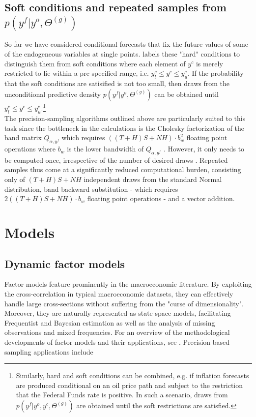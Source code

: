 \documentclass[notitlepage,a4paper,12pt]{article}
\begin{document}
\subsection{Soft conditions and repeated samples from $p(y^f|y^o, \Theta^{(g)})$}

So far we have considered conditional forecasts that fix the future values of some of the endogeneous variables at single points. \citet{waggonerzha1999_res} labels these "hard" conditions to distinguish them from soft conditions where each element of $y^c$ is merely restricted to lie within a pre-specified range, i.e. $y^c_l \leq y^c \leq y^c_u$. If the probability that the soft conditions are satisified is not too small, then draws from the unconditional predictive density $p(y^f|y^o, \Theta^{(g)})$ can be obtained until $y^c_l \leq y^c \leq y^c_u$.\footnote{Similarly, hard and soft conditions can be combined, e.g. if inflation forecasts are produced conditional on an oil price path and subject to the restriction that the Federal Funds rate is positive. In such a scenario, draws from $p(y^f|y^o, y^c, \Theta^{(g)})$ are obtained until the soft restrictions are satisfied.}\\

The precision-sampling algorithms outlined above are particularly suited to this task since the bottleneck in the calculations is the Cholesky factorization of the band matrix $Q_{\alpha, y^f}$ which requires $((T+H)S+NH)\cdot b_w^2$ floating point operations where $b_w$ is the lower bandwidth of $Q_{\alpha, y^f}$ \citep[][4.3.5]{GolubvanLoan2013}. However, it only needs to be computed once, irrespective of the number of desired draws \citep{rue2001_jrss}. Repeated samples thus come at a significantly reduced computational burden, consisting only of $(T+H)S+NH$ independent draws from the standard Normal distribution, band backward substitution - which requires $2 ((T+H)S+NH) \cdot b_w$ floating point operations \citep[][4.3.2]{GolubvanLoan2013}- and a vector addition.  

\section{Models}\label{sec:models}

\subsection{Dynamic factor models}\label{sec:dfm}

Factor models feature prominently in the macroeconomic literature. By exploiting the cross-correlation in typical macroeconomic datasets, they can effectively handle large cross-sections without suffering from the "curse of dimensionality". Moreover, they are naturally represented as state space models, facilitating Frequentist and Bayesian estimation as well as the analysis of missing observations and mixed frequencies. For an overview of the methodological developments of factor models and their applications, see \citet{stockwatson2016_hbmacro}. Precision-based sampling applications include \citet{chanjeliazkov_2009,mccausland_factor2015,kaufmannschumacher_jae2017,kaufmannschumacher_jectrcs2019}\\
\end{document}
